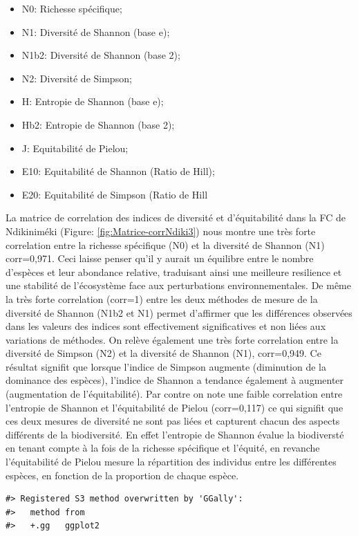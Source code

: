 \documentclass[
  12pt,
  a4paper,
  extrafontsizes,
  onecolumn,
  openright]{book}
\providecommand{\tightlist}{%
  \setlength{\itemsep}{0pt}\setlength{\parskip}{0pt}}
\theoremstyle{definition}
\theoremstyle{definition}
\theoremstyle{definition}
\theoremstyle{definition}
\theoremstyle{remark}
\begin{document}
\begin{itemize}
\tightlist
\item
  N0: Richesse spécifique;
\item
  N1: Diversité de Shannon (base e);
\item
  N1b2: Diversité de Shannon (base 2);
\item
  N2: Diversité de Simpson;
\item
  H: Entropie de Shannon (base e);
\item
  Hb2: Entropie de Shannon (base 2);
\item
  J: Equitabilité de Pielou;
\item
  E10: Equitabilité de Shannon (Ratio de Hill);
\item
  E20: Equitabilité de Simpson (Ratio de Hill
\end{itemize}

La matrice de correlation des indices de diversité et d'équitabilité dans la FC de Ndikiniméki (Figure: \ref{fig:Matrice-corrNdiki3}) nous montre une très forte correlation entre la richesse spécifique (N0) et la diversité de Shannon (N1) corr=0,971. Ceci laisse penser qu'il y aurait un équilibre entre le nombre d'espèces et leur abondance relative, traduisant ainsi une meilleure resilience et une stabilité de l'écosystème face aux perturbations environnementales. De même la très forte correlation (corr=1) entre les deux méthodes de mesure de la diversité de Shannon (N1b2 et N1) permet d'affirmer que les différences observées dans les valeurs des indices sont effectivement significatives et non liées aux variations de méthodes. On relève également une très forte correlation entre la diversité de Simpson (N2) et la diversité de Shannon (N1), corr=0,949. Ce résultat signifit que lorsque l'indice de Simpson augmente (diminution de la dominance des espèces), l'indice de Shannon a tendance également à augmenter (augmentation de l'équitabilité). Par contre on note une faible correlation entre l'entropie de Shannon et l'équitabilité de Pielou (corr=0,117) ce qui signifit que ces deux mesures de diversité ne sont pas liées et capturent chacun des aspects différents de la biodiversité. En effet l'entropie de Shannon évalue la biodiversté en tenant compte à la fois de la richesse spécifique et l'équité, en revanche l'équitabilité de Pielou mesure la répartition des individus entre les différentes espèces, en fonction de la proportion de chaque espèce.

\begin{verbatim}
#> Registered S3 method overwritten by 'GGally':
#>   method from   
#>   +.gg   ggplot2
\end{verbatim}
\end{document}
